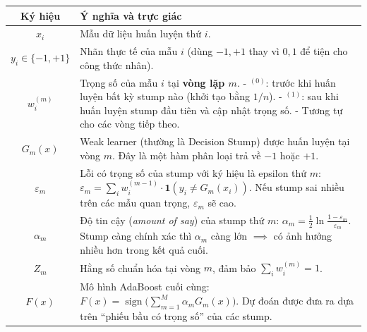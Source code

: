 \documentclass[11pt]{article}
\begin{document}
\begin{table}[H]
\centering
\begin{tabular}{|c|p{9cm}|}
\hline
\textbf{Ký hiệu} & \textbf{Ý nghĩa và trực giác} \\
\hline
\(x_i\) & Mẫu dữ liệu huấn luyện thứ \(i\). \\
\hline
\(y_i \in \{-1, +1\}\) & Nhãn thực tế của mẫu \(i\) (dùng \(-1, +1\) thay vì \(0,1\) để tiện cho công thức nhân). \\
\hline
\(w_i^{(m)}\) & Trọng số của mẫu \(i\) tại \textbf{vòng lặp \(m\)}.  
- \(^{(0)}\): trước khi huấn luyện bất kỳ stump nào (khởi tạo bằng \(1/n\)).  
- \(^{(1)}\): sau khi huấn luyện stump đầu tiên và cập nhật trọng số.  
- Tương tự cho các vòng tiếp theo. \\
\hline
\(G_m(x)\) & Weak learner (thường là Decision Stump) được huấn luyện tại vòng \(m\). Đây là một hàm phân loại trả về \(-1\) hoặc \(+1\). \\
\hline
\(\varepsilon_m\) & Lỗi có trọng số của stump với ký hiệu là epsilon thứ \(m\):  
\(\varepsilon_m = \sum_i w_i^{(m-1)} \cdot \mathbf{1}(y_i \neq G_m(x_i))\).  
Nếu stump sai nhiều trên các mẫu quan trọng, \(\varepsilon_m\) sẽ cao. \\
\hline
\(\alpha_m\) & Độ tin cậy (\textit{amount of say}) của stump thứ \(m\):  
\(\alpha_m = \tfrac{1}{2} \ln \tfrac{1 - \varepsilon_m}{\varepsilon_m}\).  
Stump càng chính xác thì \(\alpha_m\) càng lớn $\implies$ có ảnh hưởng nhiều hơn trong kết quả cuối. \\
\hline
\(Z_m\) & Hằng số chuẩn hóa tại vòng \(m\), đảm bảo \(\sum_i w_i^{(m)} = 1\). \\
\hline
\(F(x)\) & Mô hình AdaBoost cuối cùng:  
\(F(x) = \operatorname{sign}\big(\sum_{m=1}^M \alpha_m G_m(x)\big)\).  
Dự đoán được đưa ra dựa trên “phiếu bầu có trọng số” của các stump. \\
\hline
\end{tabular}
\end{table}
\end{document}
